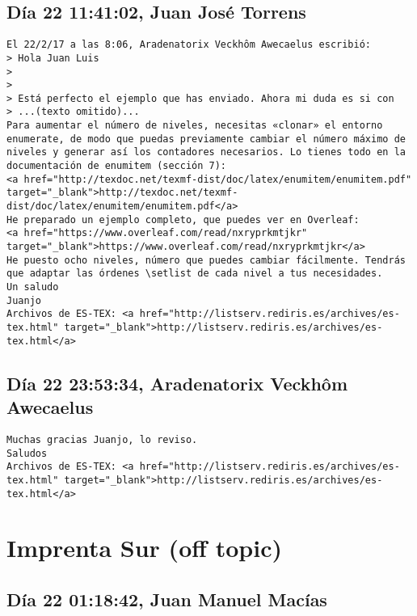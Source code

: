\documentclass[a4paper,10pt]{article}
\begin{document}
\subsection{Día 22 11:41:02, Juan José Torrens}

\begin{lstlisting}
El 22/2/17 a las 8:06, Aradenatorix Veckhôm Awecaelus escribió:
> Hola Juan Luis
>
>
> Está perfecto el ejemplo que has enviado. Ahora mi duda es si con
> ...(texto omitido)...
Para aumentar el número de niveles, necesitas «clonar» el entorno 
enumerate, de modo que puedas previamente cambiar el número máximo de 
niveles y generar así los contadores necesarios. Lo tienes todo en la 
documentación de enumitem (sección 7): 
<a href="http://texdoc.net/texmf-dist/doc/latex/enumitem/enumitem.pdf" target="_blank">http://texdoc.net/texmf-dist/doc/latex/enumitem/enumitem.pdf</a>
He preparado un ejemplo completo, que puedes ver en Overleaf: 
<a href="https://www.overleaf.com/read/nxryprkmtjkr" target="_blank">https://www.overleaf.com/read/nxryprkmtjkr</a>
He puesto ocho niveles, número que puedes cambiar fácilmente. Tendrás 
que adaptar las órdenes \setlist de cada nivel a tus necesidades.
Un saludo
Juanjo
Archivos de ES-TEX: <a href="http://listserv.rediris.es/archives/es-tex.html" target="_blank">http://listserv.rediris.es/archives/es-tex.html</a>

\end{lstlisting}

\subsection{Día 22 23:53:34, Aradenatorix Veckhôm Awecaelus}

\begin{lstlisting}
Muchas gracias Juanjo, lo reviso.
Saludos
Archivos de ES-TEX: <a href="http://listserv.rediris.es/archives/es-tex.html" target="_blank">http://listserv.rediris.es/archives/es-tex.html</a>

\end{lstlisting}
\section{Imprenta Sur (off topic)}

\subsection{Día 22 01:18:42, Juan Manuel Macías}
\end{document}
